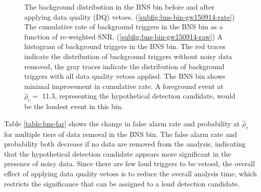 \begin{figure}[!ht]%
\centering
  \caption[BNS bin histograms - GW150914 analysis]{The background distribution in the BNS bin before and after applying data quality (DQ) vetoes. %
           (\ref{subfig:bns-bin-gw150914-rate}) The cumulative rate of background triggers %
           in the BNS bin as a function of re-weighted SNR. %
           (\ref{subfig:bns-bin-gw150914-raw}) A histogram of background triggers %
           in the BNS bin. %
           The red traces indicate the %
           distribution of background triggers without noisy data removed, %
           the gray traces indicate the distribution of background triggers with %
           all data quality vetoes applied. The BNS bin shows %
           minimal improvement in cumulative rate. A foreground event %
           at $\hat{\rho}_{c} =$ 11.3, representing the hypothetical detection %
           candidate, would be the loudest event in this bin.}
  \label{fig:bns-bin-far_GW150914}
\end{figure}

Table \ref{table:bns-far} shows the change in false alarm rate and probability at
$\hat{\rho}_c$ for multiple tiers
of data removal in the BNS bin. The false alarm rate and probability both decrease
if no data are removed from the analysis, indicating that the hypothetical detection candidate
appears more significant in the presence of noisy data. Since there are few loud triggers to be vetoed,
the overall effect of applying data quality vetoes is to reduce the overall analysis time, which
restricts the significance that can be assigned to a loud detection candidate.

